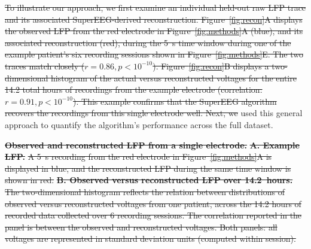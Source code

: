 \documentclass[10pt]{article}
\providecommand{\DIFaddtex}[1]{{\protect\color{blue}\uwave{#1}}} %
\providecommand{\DIFdeltex}[1]{{\protect\color{red}\sout{#1}}}                      %
\providecommand{\DIFaddbegin}{} %
\providecommand{\DIFaddend}{} %
\providecommand{\DIFdelbegin}{} %
\providecommand{\DIFdelend}{} %
\providecommand{\DIFdelFL}[1]{\DIFdel{#1}} %
\providecommand{\DIFadd}[1]{\texorpdfstring{\DIFaddtex{#1}}{#1}} %
\providecommand{\DIFdel}[1]{\texorpdfstring{\DIFdeltex{#1}}{}} %
\newcommand{\DIFscaledelfig}{0.5}
\newlength{\DIFdelgraphicswidth} %
\newlength{\DIFdelgraphicsheight} %
\newcommand{\DIFaddincludegraphics}[2][]{{\color{blue}\fbox{\DIFOincludegraphics[#1]{#2}}}} %
\newcommand{\DIFdelincludegraphics}[2][]{%
\sbox{\DIFdelgraphicsbox}{\DIFOincludegraphics[#1]{#2}}%
\settoboxwidth{\DIFdelgraphicswidth}{\DIFdelgraphicsbox} %
\settoboxtotalheight{\DIFdelgraphicsheight}{\DIFdelgraphicsbox} %
\scalebox{\DIFscaledelfig}{%
\parbox[b]{\DIFdelgraphicswidth}{\usebox{\DIFdelgraphicsbox}\\[-\baselineskip] \rule{\DIFdelgraphicswidth}{0em}}\llap{\resizebox{\DIFdelgraphicswidth}{\DIFdelgraphicsheight}{%
\setlength{\unitlength}{\DIFdelgraphicswidth}%
\begin{picture}(1,1)%
\thicklines\linethickness{2pt} %
{\color[rgb]{1,0,0}\put(0,0){\framebox(1,1){}}}%
{\color[rgb]{1,0,0}\put(0,0){\line( 1,1){1}}}%
{\color[rgb]{1,0,0}\put(0,1){\line(1,-1){1}}}%
\end{picture}%
}\hspace*{3pt}}} %
} %
\DeclareRobustCommand{\DIFaddbegin}{\DIFOaddbegin \let\includegraphics\DIFaddincludegraphics} %
\DeclareRobustCommand{\DIFaddend}{\DIFOaddend \let\includegraphics\DIFOincludegraphics} %
\DeclareRobustCommand{\DIFdelbegin}{\DIFOdelbegin \let\includegraphics\DIFdelincludegraphics} %
\DeclareRobustCommand{\DIFdelend}{\DIFOaddend \let\includegraphics\DIFOincludegraphics} %
\begin{document}
\DIFdelbegin \DIFdel{To illustrate our approach, we first examine an individual held-out
raw LFP trace and its associated SuperEEG-derived reconstruction.
Figure~\ref{fig:recon}A displays the observed LFP from the red
electrode in Figure~\ref{fig:methods}A (blue), and its associated
reconstruction (red), during the 5~s time window during one of the
example patient's six recording sessions shown in
Figure~\ref{fig:methods}E.  The two traces match closely
($r = 0.86, p < 10^{-10}$).  Figure~\ref{fig:recon}B displays a
two-dimensional histogram of the actual versus reconstructed voltages
for the entire 14.2 total hours of recordings from the example
electrode (correlation: $r = 0.91, p < 10^{-10}$).  This example
confirms that the SuperEEG algorithm recovers the recordings from this
single electrode well.  Next, we }\DIFdelend \DIFaddbegin \DIFadd{We }\DIFaddend used this general approach to quantify the algorithm's performance across the
full dataset. \DIFdelbegin %

{%
\textbf{\DIFdelFL{Observed and reconstructed LFP from a single
      electrode.}} %
\textbf{\DIFdelFL{A. Example LFP.}}  %
\DIFdelFL{A 5~s recording from the
    red electrode in Figure~\ref{fig:methods}A is displayed in blue,
    and the reconstructed LFP during the same time window is shown in
    red.  }\textbf{\DIFdelFL{B. Observed versus reconstructed LFP over
      14.2~hours.}}  %
\DIFdelFL{The two-dimensional histogram reflects the
    relation between distributions of observed versus reconstructed
    voltages from one patient, across the 14.2 hours of recorded data
    collected over 6 recording sessions.  The correlation reported in
    the panel is between the observed and reconstructed voltages.
    Both panels: all voltages are represented in standard deviation units
   (computed within session).}}
\end{document}
